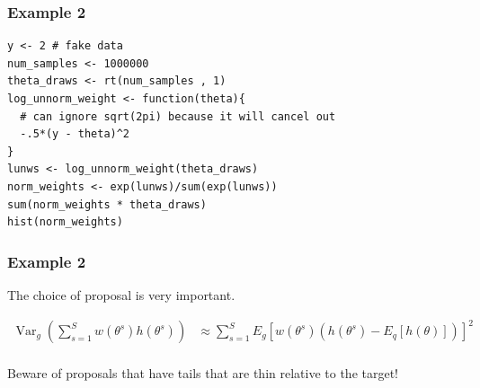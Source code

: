 \documentclass{beamer}
\begin{document}
\begin{frame}[fragile]
\frametitle{Example 2}


\begin{verbatim}
y <- 2 # fake data
num_samples <- 1000000
theta_draws <- rt(num_samples , 1)
log_unnorm_weight <- function(theta){ 
  # can ignore sqrt(2pi) because it will cancel out 
  -.5*(y - theta)^2
}
lunws <- log_unnorm_weight(theta_draws)
norm_weights <- exp(lunws)/sum(exp(lunws))
sum(norm_weights * theta_draws)
hist(norm_weights)
\end{verbatim}


\end{frame}



% 
% 
% 
% 
% 
% 
% 
% 
% 
% 

\begin{frame}[fragile]
\frametitle{Example 2}

The choice of proposal is very important. 
\newline

\begin{align*}
\operatorname{Var}_g \left( \sum_{s=1}^S w(\theta^s) h(\theta^s)
  \right) &\approx  \sum_{s=1}^S E_g\left[ w(\theta^s) (h(\theta^s) - E_q[h(\theta) ]) \right]^2    \\
\end{align*}

Beware of proposals that have tails that are thin relative to the target!

\end{frame}
\end{document}
